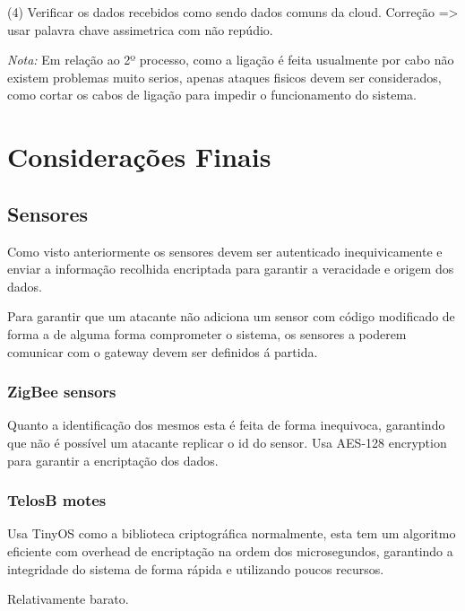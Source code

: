 \par (4) Verificar os dados recebidos como sendo dados comuns da cloud.\newline
Correção => usar palavra chave assimetrica com não repúdio. \newline



\textit{Nota:} Em relação ao 2º processo, como a ligação é feita usualmente por cabo não existem problemas muito serios, apenas ataques fisicos devem ser considerados, como cortar os cabos de ligação para impedir o funcionamento do sistema.\newline


\section{Considerações Finais}

\subsection{Sensores}
\par\hfill
\par Como visto anteriormente os sensores devem ser autenticado inequivicamente e enviar a informação recolhida encriptada para garantir a veracidade e origem dos dados.\newline
\par Para garantir que um atacante não adiciona um sensor com código modificado de forma a de alguma forma comprometer o sistema, os sensores a poderem comunicar com o gateway devem ser definidos á partida.\newline

\subsubsection{ZigBee sensors}
\par\hfill
\par Quanto a identificação dos mesmos esta é feita de forma inequivoca, garantindo que não é possível um atacante replicar o id do sensor.\newline 
Usa AES-128 encryption para garantir a encriptação dos dados.

\subsubsection{TelosB motes}
\par\hfill
\par Usa TinyOS como a biblioteca criptográfica normalmente, esta tem um algoritmo eficiente com overhead de encriptação na ordem dos microsegundos, garantindo a integridade do sistema de forma rápida e utilizando poucos recursos.\newline
\par Relativamente barato.

